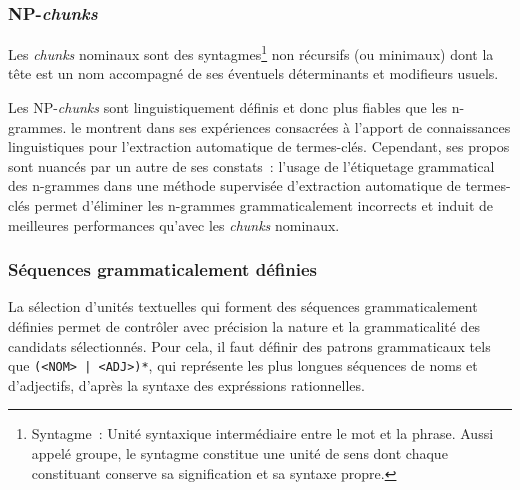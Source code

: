       \subsubsection{NP-\textit{chunks}}
      \label{subsubsec:main-state_of_the_art-automatic_keyphrase_extraction-automatic_keyphrase_extraction-np_chunks}
        Les \textit{chunks} nominaux
        sont des syntagmes\footnote{Syntagme~: Unité syntaxique
        intermédiaire entre le mot et la phrase. Aussi appelé groupe, le
        syntagme constitue une unité de sens dont chaque constituant conserve sa
        signification et sa syntaxe propre.} non récursifs (ou minimaux) dont la
        tête est un nom accompagné de ses éventuels déterminants et modifieurs
        usuels.

        \begin{example}
        \end{example}
        
        Les NP-\textit{chunks} sont linguistiquement définis et donc plus
        fiables que les n-grammes.  le
        montrent dans ses expériences consacrées à l'apport de connaissances
        linguistiques pour l'extraction automatique de termes-clés. Cependant,
        ses propos sont nuancés par un autre de ses constats~: l'usage de
        l'étiquetage grammatical des n-grammes dans une méthode supervisée
        d'extraction automatique de termes-clés permet d'éliminer les n-grammes
        grammaticalement incorrects et induit de meilleures performances qu'avec
        les \textit{chunks} nominaux.

      \subsubsection{Séquences grammaticalement définies}
      \label{subsubsec:main-state_of_the_art-automatic_keyphrase_extraction-automatic_keyphrase_extraction-pos_sequences}
        La sélection d'unités textuelles qui forment des séquences
        grammaticalement définies permet de contrôler avec précision la nature et la
        grammaticalité des candidats sélectionnés. Pour cela, il faut définir
        des patrons grammaticaux tels que \texttt{(<NOM> | <ADJ>)*}, qui
        représente les plus longues séquences de noms et d'adjectifs, d'après la
        syntaxe des expréssions rationnelles.

